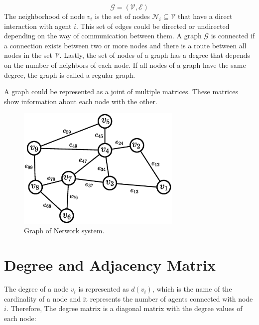 \begin{equation}
 \mathcal{G}=(\mathcal{V},\mathcal{E})   
\end{equation}
The neighborhood of node $v_{i}$ is the set of nodes $\mathcal{N}_{i} \subseteq  \mathcal{V}$ that have a direct interaction with agent $i$. This set of edges could be directed or undirected depending on the way of communication between them. A graph $\mathcal{G}$ is connected if a connection exists between two or more nodes and there is a route between all nodes in the set $\mathcal{V}$. Lastly, the set of nodes of a graph has a degree that depends on the number of neighbors of each node. If all nodes of a graph have the same degree, the graph is called a regular graph.

A graph could be represented as a joint of multiple matrices. These matrices show information about each node with the other. 



\begin{figure}[h]
\begin{center}
    \includegraphics[width=0.7\textwidth]{Kap2/Graph-01.eps}
    \caption{ Graph of Network system.}
    \label{Graph}
\end{center}
\end{figure}



\section*{Degree and Adjacency Matrix}

The degree of a node $v_{i}$ is represented as $d(v_{i})$, which is the name of the cardinality of a node and it represents the number of agents connected with node $i$. Therefore, The degree matrix is a diagonal matrix with the degree values of each node:

